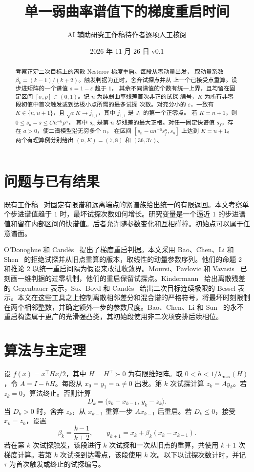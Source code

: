 \documentclass[11pt,a4paper,UTF8,fontset=fandol]{ctexart}
\title{单一弱曲率谱值下的梯度重启时间}
\author{\small AI 辅助研究工作稿\quad 待作者逐项人工核阅}
\date{2026 年 11 月 26 日 \quad v0.1}
\newcommand{\eps}{\varepsilon}
\begin{document}
\maketitle
\begin{abstract}
考察正定二次目标上的离散 Nesterov 梯度重启。每段从零动量出发，
取动量系数 \(\beta_k=(k-1)/(k+2)\)。触发判据为正时，舍弃试探点并从
上一个已接受点重算。设步进矩阵的一个谱值 \(s=1-\eps\) 趋于 \(1\)，
其余不同谱值的个数有统一上界，且均留在固定区间
\([\sigma,\rho]\subset(0,1)\)。记 \(n\) 为纯弱曲率残差首次非正的试探
编号，\(K\) 为所有非零段初值中首次触发或到达极小点所需的最多试探
次数。对充分小的 \(\eps\)，一致有 \(K\in\{n,n+1\}\)，且
\(\sqrt{\eps}K\to j_{1,1}\)，其中 \(j_{1,1}\) 是 \(J_1\) 的第一个正零点。
若 \(K=n+1\)，则 \(0\le s_n-s\le C n^{-6}\rho^n\)，
其中 \(s_n\) 是第 \(n\) 步残差的最大正根。对任一固定快谱值
\(s_f\)，存在 \(a>0\)，使二谱模型沿无穷多个 \(n\)，
在区间 \([s_n-a n^{-6}s_f^n,s_n]\) 上达到 \(K=n+1\)。两个有理算例分别给出
\((n,K)=(7,8)\) 和 \((36,37)\)。
\end{abstract}

\section{问题与已有结果}
既有工作稿~\cite{archive} 对固定有限谱和远离端点的紧谱族给出统一的有限返回。本文考察单个步进谱值趋于 \(1\) 时，最坏试探次数如何增长。研究变量是一个逼近 \(1\) 的步进谱值和留在内部区间的快谱值。后者允许随参数变化和互相碰撞。初始点可以属于任意谱面。

O'Donoghue 和 Candès~\cite{oc} 提出了梯度重启判据。本文采用 Bao、Chen、Li 和 Shen~\cite{bao25} 的拒绝试探并从旧点重算的版本，取线性的动量参数序列。他们的命题 2 和推论 2 以统一重启间隔为假设来改进收敛界。Moursi、Pavlovic 和 Vavasis~\cite[命题 3.2]{moursi} 已刻画一维判据的过零机制，他们的重启保留试探点。Kindermann~\cite[定理 1]{kindermann} 给出离散残差的 Gegenbauer 表示，Su、Boyd 和 Candès~\cite{su} 给出二次目标连续极限的 Bessel 表示。本文在这些工具之上控制离散相邻差分和混合谱的严格符号，将最坏时刻限制在两个相邻整数，并确定额外一步的参数尺度。Bao、Chen、Li 和 Sun~\cite[定理 1.1]{bao26} 的永不重启构造属于更广的光滑强凸类，其初始段使用非二次项安排后续相位。

\section{算法与主定理}
设 \(f(x)=x^\top Hx/2\)，其中 \(H=H^\top\succ0\) 为有限维矩阵。取 \(0<h<1/\lambda_{\max}(H)\)，令 \(A=I-hH\)。每段从 \(x_0=y_1=u\ne0\) 出发。第 \(k\) 次试探计算 \(z_k=Ay_k\)。若 \(z_k=0\)，算法终止。否则计算
\[
 D_k=\langle z_k-x_{k-1},\, y_k-z_k\rangle .
\]
当 \(D_k>0\) 时，舍弃 \(z_k\)，从 \(x_{k-1}\) 重算一步 \(Ax_{k-1}\) 后重启。若 \(D_k\le0\)，接受 \(x_k=z_k\)，设置
\[
 \beta_k=\frac{k-1}{k+2},\qquad
 y_{k+1}=x_k+\beta_k(x_k-x_{k-1}).
\]
若在第 \(k\) 次试探触发，该段进行 \(k\) 次试探和一次从旧点的重算，共使用 \(k+1\) 次梯度计算。若第 \(k\) 次试探到达零点，该段使用 \(k\) 次。以下以试探次数计时，并记 \(\tau\) 为首次触发或终止的试探编号。
\end{document}
